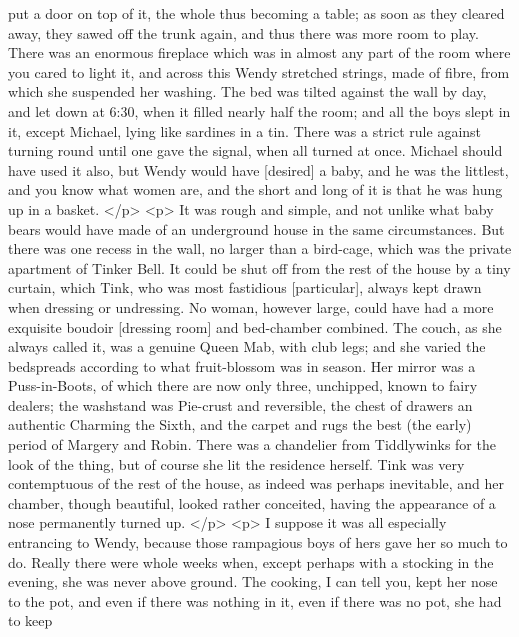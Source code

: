       put a door on top of it, the whole thus becoming a table; as soon as they
      cleared away, they sawed off the trunk again, and thus there was more room
      to play. There was an enormous fireplace which was in almost any part of
      the room where you cared to light it, and across this Wendy stretched
      strings, made of fibre, from which she suspended her washing. The bed was
      tilted against the wall by day, and let down at 6:30, when it filled
      nearly half the room; and all the boys slept in it, except Michael, lying
      like sardines in a tin. There was a strict rule against turning round
      until one gave the signal, when all turned at once. Michael should have
      used it also, but Wendy would have [desired] a baby, and he was the
      littlest, and you know what women are, and the short and long of it is
      that he was hung up in a basket.
    </p>
    <p>
      It was rough and simple, and not unlike what baby bears would have made of
      an underground house in the same circumstances. But there was one recess
      in the wall, no larger than a bird-cage, which was the private apartment
      of Tinker Bell. It could be shut off from the rest of the house by a tiny
      curtain, which Tink, who was most fastidious [particular], always kept
      drawn when dressing or undressing. No woman, however large, could have had
      a more exquisite boudoir [dressing room] and bed-chamber combined. The
      couch, as she always called it, was a genuine Queen Mab, with club legs;
      and she varied the bedspreads according to what fruit-blossom was in
      season. Her mirror was a Puss-in-Boots, of which there are now only three,
      unchipped, known to fairy dealers; the washstand was Pie-crust and
      reversible, the chest of drawers an authentic Charming the Sixth, and the
      carpet and rugs the best (the early) period of Margery and Robin. There
      was a chandelier from Tiddlywinks for the look of the thing, but of course
      she lit the residence herself. Tink was very contemptuous of the rest of
      the house, as indeed was perhaps inevitable, and her chamber, though
      beautiful, looked rather conceited, having the appearance of a nose
      permanently turned up.
    </p>
    <p>
      I suppose it was all especially entrancing to Wendy, because those
      rampagious boys of hers gave her so much to do. Really there were whole
      weeks when, except perhaps with a stocking in the evening, she was never
      above ground. The cooking, I can tell you, kept her nose to the pot, and
      even if there was nothing in it, even if there was no pot, she had to keep
